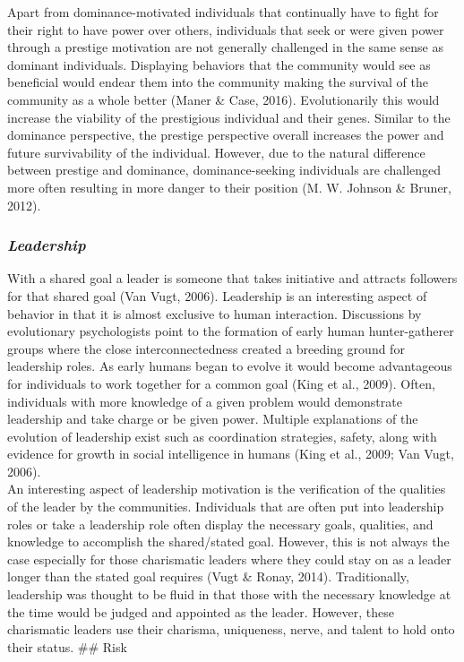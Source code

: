 \documentclass[
  donotrepeattitle,doc, 12pt, a4paper,floatsintext]{apa7}
\begin{document}
Apart from dominance-motivated individuals that continually have to fight for their right to have power over others, individuals that seek or were given power through a prestige motivation are not generally challenged in the same sense as dominant individuals. Displaying behaviors that the community would see as beneficial would endear them into the community making the survival of the community as a whole better (Maner \& Case, 2016). Evolutionarily this would increase the viability of the prestigious individual and their genes. Similar to the dominance perspective, the prestige perspective overall increases the power and future survivability of the individual. However, due to the natural difference between prestige and dominance, dominance-seeking individuals are challenged more often resulting in more danger to their position (M. W. Johnson \& Bruner, 2012).

\hypertarget{leadership}{%
\subsubsection{\texorpdfstring{\emph{Leadership}}{Leadership}}\label{leadership}}

With a shared goal a leader is someone that takes initiative and attracts followers for that shared goal (Van Vugt, 2006). Leadership is an interesting aspect of behavior in that it is almost exclusive to human interaction. Discussions by evolutionary psychologists point to the formation of early human hunter-gatherer groups where the close interconnectedness created a breeding ground for leadership roles. As early humans began to evolve it would become advantageous for individuals to work together for a common goal (King et al., 2009). Often, individuals with more knowledge of a given problem would demonstrate leadership and take charge or be given power. Multiple explanations of the evolution of leadership exist such as coordination strategies, safety, along with evidence for growth in social intelligence in humans (King et al., 2009; Van Vugt, 2006).\\

An interesting aspect of leadership motivation is the verification of the qualities of the leader by the communities. Individuals that are often put into leadership roles or take a leadership role often display the necessary goals, qualities, and knowledge to accomplish the shared/stated goal. However, this is not always the case especially for those charismatic leaders where they could stay on as a leader longer than the stated goal requires (Vugt \& Ronay, 2014). Traditionally, leadership was thought to be fluid in that those with the necessary knowledge at the time would be judged and appointed as the leader. However, these charismatic leaders use their charisma, uniqueness, nerve, and talent to hold onto their status.
\#\# Risk
\end{document}
